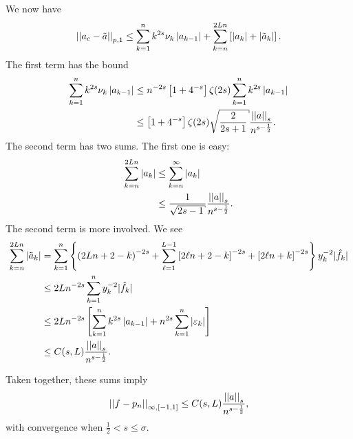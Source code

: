 We now have
%
\begin{equation}
    \left| \left| a_{c}-\tilde{a} \right| \right|_{p,1} \le \sum_{k=1}^{n}k^{2s}\nu_{k}\left| a_{k-1} \right|
        + \sum_{k=n}^{2Ln}\left[ \left| a_{k} \right| + \left| \tilde{a}_{k} \right| \right].
\end{equation}
%
The first term has the bound
%
\begin{align}
    \sum_{k=1}^{n}k^{2s}\nu_{k}\abs{a_{k-1}}
        &\le n^{-2s}\brackets{1+4^{-s}}\zeta(2s)
            \sum_{k=1}^{n}k^{2s}\abs{a_{k-1}} \nonumber\\
    &\le \brackets{1+4^{-s}}\zeta(2s)\sqrt{\frac{2}{2s+1}}\frac{\norm{a}_{s}}{
        n^{s-\frac{1}{2}}}.
\end{align}
%
The second term has two sums.
The first one is easy:
%
\begin{align}
    \sum_{k=n}^{2Ln} \abs{a_{k}} &\le \sum_{k=n}^{\infty} \abs{a_{k}}
        \nonumber\\
    &\le \frac{1}{\sqrt{2s-1}}\frac{\norm{a}_{s}}{n^{s-\frac{1}{2}}}.
\end{align}
%
The second term is more involved.
We see
%
\begin{align}
    \sum_{k=n}^{2Ln}\left| \tilde{a}_{k} \right|
        &= \sum_{k=1}^{n}\left\{ \left( 2Ln+2-k \right)^{-2s} +
        \sum_{\ell=1}^{L-1}\left[ 2\ell n+2-k \right]^{-2s} +
            \left[ 2\ell n+k \right]^{-2s} \right\}y_{k}^{-2}|\hat{f}_{k}|
        \nonumber\\
    &\le 2Ln^{-2s}\sum_{k=1}^{n}y_{k}^{-2}|\hat{f}_{k}|
        \nonumber\\
    &\le 2Ln^{-2s}\left[ \sum_{k=1}^{n}k^{2s}\left| a_{k-1} \right|
        + n^{2s}\sum_{k=1}^{n}\left| \varepsilon_{k} \right| \right]
        \nonumber\\
    &\le C(s,L)\frac{\left| \left| a \right| \right|_{s}}{n^{s-\frac{1}{2}}}.
\end{align}

Taken together, these sums imply
%
\begin{equation}
    \left| \left| f-p_{n} \right| \right|_{\infty,[-1,1]}
        \le C(s,L)\frac{\left| \left| a \right| \right|_{s}}{n^{s-\frac{1}{2}}},
\end{equation}
%
with convergence when $\frac{1}{2}<s\le\sigma$.


